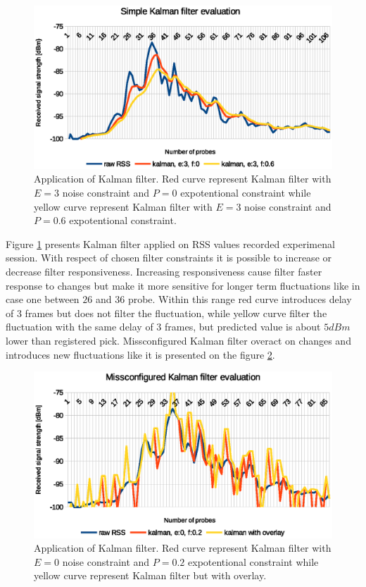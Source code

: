 \documentclass[../main.tex]{subfiles}
\begin{document}
\begin{figure}[!htbp]
\includegraphics[width=\textwidth]{pictures/filtering_simple_kalman}
\centering
\caption{Application of Kalman filter. Red curve represent Kalman filter with $E=3$ noise constraint and $P=0$ expotentional constraint while yellow curve represent Kalman filter with $E=3$ noise constraint and $P=0.6$ expotentional constraint. }
\label{fig:filtering_simple_kalman}
\end{figure}

Figure \ref{fig:filtering_simple_kalman} presents Kalman filter applied on RSS values recorded experimenal session. With respect of chosen filter constraints it is possible to increase or decrease filter responsiveness. Increasing responsiveness cause filter faster response to changes but make it more sensitive for longer term fluctuations like in case one between $26$ and $36$ probe. Within this range red curve introduces delay of $3$ frames but does not filter the fluctuation, while yellow curve filter the fluctuation with the same delay of $3$ frames, but predicted value is about $5dBm$ lower than registered pick. Missconfigured Kalman filter overact on changes and introduces new fluctuations like it is presented on the figure \ref{fig:filtering_simple_kalman_missconfigured}.

\begin{figure}[!htbp]
\includegraphics[width=\textwidth]{pictures/filtering_simple_kalman_missconfigured}
\centering
\caption{Application of Kalman filter. Red curve represent Kalman filter with $E=0$ noise constraint and $P=0.2$ expotentional constraint while yellow curve represent Kalman filter but with overlay. }
\label{fig:filtering_simple_kalman_missconfigured}
\end{figure}
\end{document}
